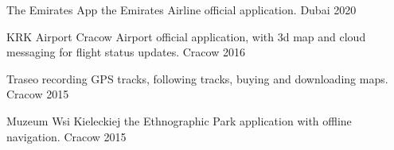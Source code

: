 

\begin{cvhonors2}


\cvhonor
    {The Emirates App} %
    {the Emirates Airline official application.} %
    {Dubai} %
    {2020} %

  \cvhonor
    {KRK Airport} %
    {Cracow Airport official application, with 3d map and cloud messaging for flight status updates.} %
    {Cracow} %
    {2016} %

  \cvhonor
    {Traseo} %
    {recording GPS tracks, following tracks, buying and downloading maps.} %
    {Cracow} %
    {2015} %

  
  \cvhonor
    {Muzeum Wsi Kieleckiej} %
    {the Ethnographic Park application with offline navigation.} %
    {Cracow} %
    {2015} %
\end{cvhonors2}
